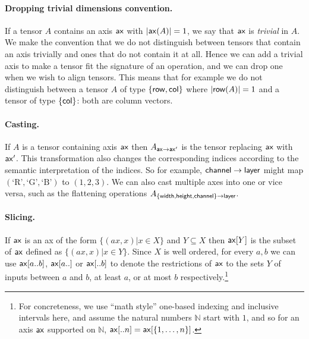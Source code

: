 \documentclass{article}
\begin{document}
\paragraph{Dropping trivial dimensions convention.} If a tensor $A$  contains an axis $\mathsf{ax}$ with $|\mathsf{ax}(A)|=1$, we say that $\mathsf{ax}$ is \emph{trivial} in $A$.
We make the convention that we do not distinguish between tensors that contain an axis trivially and ones that do not contain it at all.
Hence we can add a trivial axis to make a tensor fit the signature of an operation, and we can drop one when we wish to align tensors.
This means that for example we do not distinguish between a tensor $A$ of type $\{ \mathsf{row} , \mathsf{col} \}$ where $|\mathsf{row}(A)|=1$ and a tensor of type $\{ \mathsf{col} \}$: both are column vectors.


\paragraph{Casting.} If $A$ is a tensor containing axis $\mathsf{ax}$ then $A_{\mathsf{ax} \rightarrow \mathsf{ax}'}$ is the tensor replacing $\mathsf{ax}$ with $\mathsf{ax'}$. 
This transformation  also changes the corresponding indices according to the semantic interpretation of the indices. 
So for example, $\mathsf{channel} \rightarrow \mathsf{layer}$ might map $( \text{`R'}, \text{`G'}, \text{`B'} )$ to $(1,2,3)$.
We can also cast multiple axes into one or vice versa, such as the flattening operations $A_{ \{ \mathsf{width},\mathsf{height},\mathsf{channel} \} \rightarrow \mathsf{layer} }$.

\paragraph{Slicing.} If $\mathsf{ax}$ is an ax of the form $\{ (ax,x) | x \in X \}$ and $Y \subseteq X$ then $\mathsf{ax}[Y]$ is the subset of $\mathsf{ax}$ defined as $\{ (ax,x) | x\in Y \}$. Since $X$ is well ordered, for every $a,b$ we can use $\mathsf{ax}[a..b]$, $\mathsf{ax}[a..]$ or $\mathsf{ax}[..b]$ to denote the restrictions of $\mathsf{ax}$ to the sets $Y$ of inputs between $a$ and $b$, at least $a$, or at most $b$ respectively.\footnote{For concreteness, we use ``math style'' one-based indexing and inclusive intervals here, and assume the natural numbers $\mathbb{N}$ start with $1$, and so for an axis $\mathsf{ax}$ supported on $\mathbb{N}$,  $\mathsf{ax}[..n] = \mathsf{ax}[\{1,\ldots,n\}]$.}











\iffalse %
\section*{References}
\fi



\end{document}
